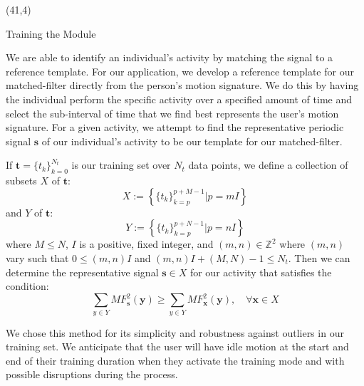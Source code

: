 \documentclass[unknownkeysallowed,final]{beamer}
\begin{document}
\begin{frame}{}
\begin{textblock}{18}
\end{textblock}

\begin{textblock}{17.3}(41,4)

\begin{block}{\small{Training the Module}}

We are able to identify an individual's activity by matching the signal to a reference template.
For our application, we develop a reference template for our matched-filter directly from the person's motion signature.
We do this by having the individual perform the specific activity over a specified amount of time and select the sub-interval of time that we find best represents the user's motion signature.
For a given activity, we attempt to find the representative periodic signal $\textbf{s}$ of our individual's activity to be our template for our matched-filter.

If $\textbf{t} = \{t_k\}_{k=0}^{N_t}$ is our training set over $N_t$ data points, we define a collection of subsets $X$ of $\textbf{t}$:
%
\begin{equation} \label{eq:X_subsets_of_training_eq}
X := \left \{ \{t_k\}_{k=p}^{p+M-1} | p=mI \right \}
\end{equation}
%
and $Y$ of $\textbf{t}$:
%
\begin{equation} \label{eq:Y_subsets_of_training_eq}
Y := \left \{ \{t_k\}_{k=p}^{p+N-1} | p=nI \right \}
\end{equation}
%
where $M \leq N$, $I$ is a positive, fixed integer, and $(m,n) \in \mathbb{Z}^2$ where $(m,n)$ vary such that $0 \leq (m,n)I$ and $(m,n)I + (M,N) - 1 \leq N_t$. Then we can determine the representative signal $\textbf{s} \in X$ for our activity that satisfies the condition:
%
\begin{equation} \label{eq:s_condition}
\sum_{y \in Y}MF^2_{\textbf{s}}(\textbf{y}) \geq \sum_{y \in Y}MF^2_{\textbf{x}}(\textbf{y}), \quad \forall \textbf{x} \in X
\end{equation}

We chose this method for its simplicity and robustness against outliers in our training set. We anticipate that the user will have idle motion at the start and end of their training duration when they activate the training mode and with possible disruptions during the process.

\end{block}


\end{textblock}
\end{frame}
\end{document}
